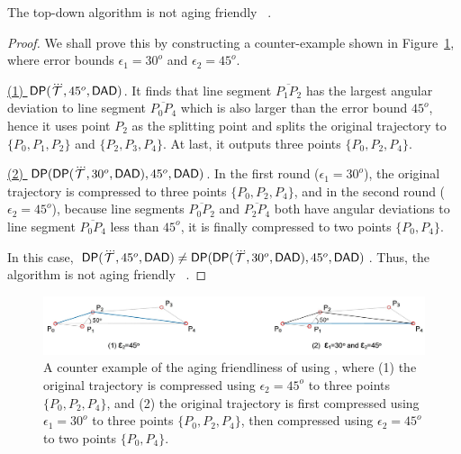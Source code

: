 
\begin{proposition}
	\label{theo-aging-dp-dad}
	The top-down algorithm \dpa is not aging friendly \wrt~\dad.
\end{proposition}

\begin{proof}
	We shall prove this by constructing a counter-example shown in Figure~\ref{fig:aging-dp-dad}, where error bounds $\epsilon_1 =30^o$ and $\epsilon_2=45^o$.
	
	\underline{(1) ${{\mathsf{DP}}}(\dddot{\mathcal{T}}, 45^o, {\mathsf{DAD}})$}. It finds that line segment $\overline{P_1P_2}$ has the largest angular deviation to line segment $\overline{P_0P_4}$ which is also larger than the error bound $45^o$, hence it uses point $P_2$ as the splitting point and splits the original trajectory to $\{P_0, P_1, P_2\}$ and $\{P_2, P_3, P_4\}$. At last, it outputs three points $\{P_0, P_2, P_4\}$.
	
	\underline{(2) ${{\mathsf{DP}}}({\mathsf{DP}}(\dddot{\mathcal{T}}, 30^o, {\mathsf{DAD}}), 45^o, {\mathsf{DAD}})$}. In the first round ($\epsilon_1=30^o$), the original trajectory is compressed to three points $\{P_0, P_2, P_4\}$, and in the second round ($\epsilon_2=45^o$), because line segments  $\overline{P_0P_2}$ and $\overline{P_2P_4}$ both have angular deviations to line segment $\overline{P_0P_4}$ less than $45^o$, it is finally compressed to two points $\{P_0, P_4\}$.
	
	In this case, ${{\mathsf{DP}}}(\dddot{\mathcal{T}}, 45^o, {\mathsf{DAD}}) \ne {{\ensuremath {\mathsf{DP}}}}({\mathsf{DP}}(\dddot{\mathcal{T}}, 30^o, {\mathsf{DAD}}), 45^o, {\mathsf{DAD}})$. Thus, the \dpa algorithm is not aging friendly \wrt~\dad.
\end{proof}

\begin{figure}
	\centering
	\includegraphics[scale=0.66]{Figures/Fig-aging-dp.jpg}
	
	\caption{\small A counter example of the aging friendliness of \dpa using \dad, where (1) the original trajectory is compressed using $\epsilon_2=45^o$ to three points $\{P_0, P_2, P_4\}$, and (2) the original trajectory is first compressed using $\epsilon_1=30^o$ to three points $\{P_0, P_2, P_4\}$, then compressed using $\epsilon_2=45^o$ to two points $\{P_0, P_4\}$. }
	\vspace{-1ex}
	\label{fig:aging-dp-dad}
\end{figure}


